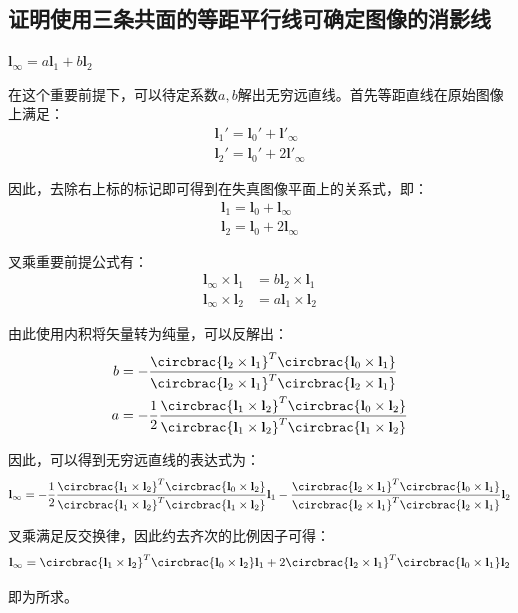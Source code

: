 \documentclass[11pt]{article}
\begin{document}
\subsection{证明使用三条共面的等距平行线可确定图像的消影线}
$\mathbf{l_\infty}=a\mathbf{l}_1+b\mathbf{l}_2$\par
在这个重要前提下，可以待定系数$a,b$解出无穷远直线。首先等距直线在原始图像上满足：
\begin{align*}
  \mathbf{l}_1'=\mathbf{l}_0'+\mathbf{l'}_\infty \\
  \mathbf{l}_2'=\mathbf{l}_0'+2\mathbf{l'}_\infty
\end{align*}\par
因此，去除右上标的标记即可得到在失真图像平面上的关系式，即：
\begin{align*}
  \mathbf{l}_1=\mathbf{l}_0+{\mathbf{l}_\infty  } \\
  \mathbf{l}_2=\mathbf{l}_0+{2\mathbf{l}_\infty  }
\end{align*}\par
叉乘重要前提公式有：
\begin{align*}
  \mathbf{l}_\infty\times\mathbf{l}_1 & =b\mathbf{l}_2\times\mathbf{l}_1 \\
  \mathbf{l}_\infty\times\mathbf{l}_2 & =a\mathbf{l}_1\times\mathbf{l}_2
\end{align*}\par
由此使用内积将矢量转为纯量，可以反解出：
\begin{align*}
  b & =-\frac{\circbrac{\mathbf{l}_2\times\mathbf{l}_1}^T\circbrac{\mathbf{l}_0\times\mathbf{l}_1}}{\circbrac{\mathbf{l}_2\times\mathbf{l}_1}^T\circbrac{\mathbf{l}_2\times\mathbf{l}_1}}            \\
  a & =-\frac{1}{2}\frac{\circbrac{\mathbf{l}_1\times\mathbf{l}_2}^T\circbrac{\mathbf{l}_0\times\mathbf{l}_2}}{\circbrac{\mathbf{l}_1\times\mathbf{l}_2}^T\circbrac{\mathbf{l}_1\times\mathbf{l}_2}}
\end{align*}\par
因此，可以得到无穷远直线的表达式为：
\begin{equation*}
  \mathbf{l}_\infty=-\frac{1}{2}\frac{\circbrac{\mathbf{l}_1\times\mathbf{l}_2}^T\circbrac{\mathbf{l}_0\times\mathbf{l}_2}}{\circbrac{\mathbf{l}_1\times\mathbf{l}_2}^T\circbrac{\mathbf{l}_1\times\mathbf{l}_2}}\mathbf{l}_1-\frac{\circbrac{\mathbf{l}_2\times\mathbf{l}_1}^T\circbrac{\mathbf{l}_0\times\mathbf{l}_1}}{\circbrac{\mathbf{l}_2\times\mathbf{l}_1}^T\circbrac{\mathbf{l}_2\times\mathbf{l}_1}}\mathbf{l}_2
\end{equation*}\par
叉乘满足反交换律，因此约去齐次的比例因子可得：
\begin{equation*}
  \mathbf{l}_\infty=\circbrac{\mathbf{l}_1\times\mathbf{l}_2}^T\circbrac{\mathbf{l}_0\times\mathbf{l}_2}\mathbf{l}_1+2\circbrac{\mathbf{l}_2\times\mathbf{l}_1}^T\circbrac{\mathbf{l}_0\times\mathbf{l}_1}\mathbf{l}_2
\end{equation*}\par
即为所求。
\end{document}

